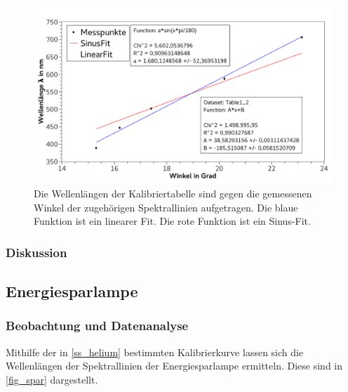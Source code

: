 \documentclass[
	a4paper,
	12pt,
	pagesize,
	ngerman
]{scrartcl}
\begin{document}
	\begin{figure}[H] 
		\includegraphics[width=1\textwidth]{fig_helium} 
		\centering
		\caption{Die Wellenlängen der Kalibriertabelle sind gegen die gemessenen Winkel der zugehörigen Spektrallinien aufgetragen.
		Die blaue Funktion ist ein linearer Fit.
		Die rote Funktion ist ein Sinus-Fit.}
		\label{fig_helium}
		\centering
	\end{figure}

	\subsubsection{Diskussion}
	
	\subsection{Energiesparlampe}
	\subsubsection{Beobachtung und Datenanalyse}
	Mithilfe der in \cref{ss_helium} bestimmten Kalibrierkurve lassen sich die Wellenlängen der Spektrallinien der Energiesparlampe ermitteln.
	Diese sind in \cref{fig_spar} dargestellt.
\end{document}
